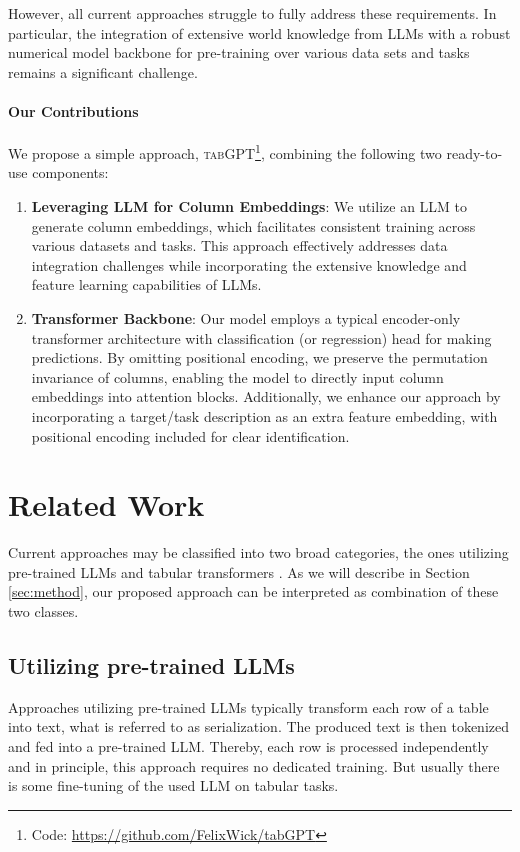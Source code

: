 \documentclass{article}
\begin{document}
However, all current approaches struggle to fully address these requirements. In particular, the integration of extensive world knowledge from LLMs with a robust numerical model backbone for pre-training over various data sets and tasks remains a significant challenge.

\paragraph{Our Contributions}
We propose a simple approach, \textsc{tabGPT}\footnote{Code: \url{https://github.com/FelixWick/tabGPT}}, combining the following two ready-to-use components:
\begin{enumerate}
\item \textbf{Leveraging LLM for Column Embeddings}: We utilize an LLM to generate column embeddings, which facilitates consistent training across various datasets and tasks. This approach effectively addresses data integration challenges while incorporating the extensive knowledge and feature learning capabilities of LLMs.
\item \textbf{Transformer Backbone}: Our model employs a typical encoder-only transformer architecture with classification (or regression) head for making predictions. By omitting positional encoding, we preserve the permutation invariance of columns, enabling the model to directly input column embeddings into attention blocks. Additionally, we enhance our approach by incorporating a target/task description as an extra feature embedding, with positional encoding included for clear identification.
\end{enumerate}


\section{Related Work}
\label{sec:literature}

Current approaches may be classified into two broad categories, the ones utilizing pre-trained LLMs and tabular transformers \cite{schambach2024}. As we will describe in Section \ref{sec:method}, our proposed approach can be interpreted as combination of these two classes.

\subsection{Utilizing pre-trained LLMs}
Approaches utilizing pre-trained LLMs typically transform each row of a table into text, what is referred to as serialization. The produced text is then tokenized and fed into a pre-trained LLM. Thereby, each row is processed independently and in principle, this approach requires no dedicated training. But usually there is some fine-tuning of the used LLM on tabular tasks.
\end{document}

